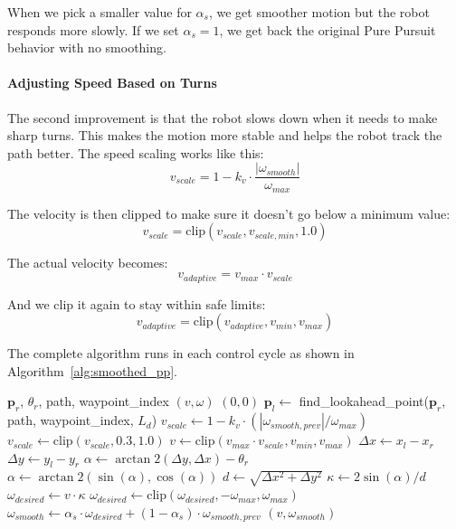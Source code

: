 \documentclass[11pt]{article}
\begin{document}
When we pick a smaller value for $\alpha_s$, we get smoother motion but the robot responds more slowly. If we set $\alpha_s = 1$, we get back the original Pure Pursuit behavior with no smoothing.

\paragraph{Adjusting Speed Based on Turns}

The second improvement is that the robot slows down when it needs to make sharp turns. This makes the motion more stable and helps the robot track the path better. The speed scaling works like this:
\begin{equation}
	v_{scale} = 1 - k_v \cdot \frac{|\omega_{smooth}|}{\omega_{max}}
\end{equation}

The velocity is then clipped to make sure it doesn't go below a minimum value:
\begin{equation}
	v_{scale} = \text{clip}(v_{scale}, v_{scale,min}, 1.0)
\end{equation}

The actual velocity becomes:
\begin{equation}
	v_{adaptive} = v_{max} \cdot v_{scale}
\end{equation}

And we clip it again to stay within safe limits:
\begin{equation}
	v_{adaptive} = \text{clip}(v_{adaptive}, v_{min}, v_{max})
\end{equation}

The complete algorithm runs in each control cycle as shown in Algorithm~\ref{alg:smoothed_pp}.

\begin{algorithm}
	\caption{Smoothed Pure Pursuit Control Loop}
	\label{alg:smoothed_pp}
	\begin{algorithmic}[1]
		\Require $\mathbf{p}_r$, $\theta_r$, path, waypoint\_index
		\Ensure $(v, \omega)$
		\State \Return $(0, 0)$
		\EndIf
		\State $\mathbf{p}_l \gets$ find\_lookahead\_point($\mathbf{p}_r$, path, waypoint\_index, $L_d$)
		\State $v_{scale} \gets 1 - k_v \cdot (|\omega_{smooth,prev}| / \omega_{max})$
		\State $v_{scale} \gets \text{clip}(v_{scale}, 0.3, 1.0)$
		\State $v \gets \text{clip}(v_{max} \cdot v_{scale}, v_{min}, v_{max})$
		\State $\Delta x \gets x_l - x_r$
		\State $\Delta y \gets y_l - y_r$
		\State $\alpha \gets \arctan2(\Delta y, \Delta x) - \theta_r$
		\State $\alpha \gets \arctan2(\sin(\alpha), \cos(\alpha))$
		\State $d \gets \sqrt{\Delta x^2 + \Delta y^2}$
		\State $\kappa \gets 2\sin(\alpha) / d$
		\State $\omega_{desired} \gets v \cdot \kappa$
		\State $\omega_{desired} \gets \text{clip}(\omega_{desired}, -\omega_{max}, \omega_{max})$
		\State $\omega_{smooth} \gets \alpha_s \cdot \omega_{desired} + (1 - \alpha_s) \cdot \omega_{smooth,prev}$
		\State \Return $(v, \omega_{smooth})$
	\end{algorithmic}
\end{algorithm}
\end{document}
